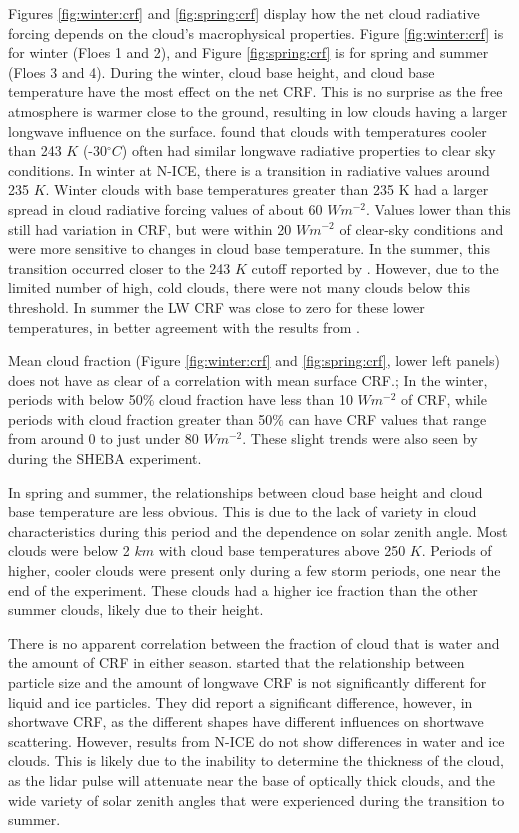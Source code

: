 Figures \ref{fig:winter:crf} and \ref{fig:spring:crf} display how the net cloud radiative forcing depends on the cloud's macrophysical properties. Figure \ref{fig:winter:crf} is for winter (Floes 1 and 2), and Figure \ref{fig:spring:crf} is for spring and summer (Floes 3 and 4). During the winter, cloud base height, and cloud base temperature have the most effect on the net CRF. This is no surprise as the free atmosphere is warmer close to the ground, resulting in low clouds having a larger longwave influence on the surface. \citet{shupe:2004} found that clouds with temperatures cooler than 243 $K$ (-30$^{\circ}C$) often had similar longwave radiative properties to clear sky conditions. In winter at N-ICE, there is a transition in radiative values around 235 $K$. Winter clouds with base temperatures greater than 235 K had a larger spread in cloud radiative forcing values of about 60 $Wm^{-2}$. Values lower than this still had variation in CRF, but were within 20 $Wm^{-2}$ of clear-sky conditions and were more sensitive to changes in cloud base temperature. In the summer, this transition occurred closer to the 243 $K$ cutoff reported by \citet{shupe:2004}. However, due to the limited number of high, cold clouds, there were not many clouds below this threshold. In summer the LW CRF was close to zero for these lower temperatures, in better agreement with the results from \citet{shupe:2004}. 

Mean cloud fraction (Figure \ref{fig:winter:crf} and \ref{fig:spring:crf}, lower left panels) does not have as clear of a correlation with mean surface CRF.; In the winter, periods with below 50$\%$ cloud fraction have less than 10 $Wm^{-2}$ of CRF, while periods with cloud fraction greater than 50$\%$ can have CRF values that range from around 0 to just under 80 $Wm^{-2}$. These slight trends were also seen by \citet{shupe:2004} during the SHEBA experiment. 

In spring and summer, the relationships between cloud base height and cloud base temperature are less obvious. This is due to the lack of variety in cloud characteristics during this period and the dependence on solar zenith angle. Most clouds were below 2 $km$ with cloud base temperatures above 250 $K$. Periods of higher, cooler clouds were present only during a few storm periods, one near the end of the experiment. These clouds had a higher ice fraction than the other summer clouds, likely due to their height. 

There is no apparent correlation between the fraction of cloud that is water and the amount of CRF in either season. \citet{schweiger:1999} started that the relationship between particle size and the amount of longwave CRF is not significantly different for liquid and ice particles. They did report a significant difference, however, in shortwave CRF, as the different shapes have different influences on shortwave scattering. However, results from N-ICE do not show differences in water and ice clouds. This is likely due to the inability to determine the thickness of the cloud, as the lidar pulse will attenuate near the base of optically thick clouds, and the wide variety of solar zenith angles that were experienced during the transition to summer. 


